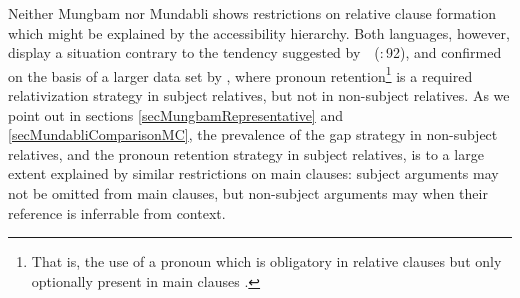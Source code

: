 \documentclass[10pt,twoside]{article}
\newcommand{\citepage}[2]{\citeauthor{#1}~{(\citeyear{#1}:\,{#2})}}
\begin{document}
Neither Mungbam nor Mundabli shows restrictions on relative clause formation which
might be explained by the accessibility hierarchy. Both languages,
however, display a situation contrary to the tendency suggested
by~\citepage{keenan:1977}{92}, and confirmed on the basis of a larger data set
by \cite{wals-2011-123,wals-2011-122}, where pronoun 
retention\footnote{That is, the use of a pronoun which is obligatory in relative clauses but only optionally present in main
clauses \citep{wals-2011-122}.}
is a required relativization strategy
in subject relatives, but not in non-subject relatives.
%
As we point out in sections \ref{secMungbamRepresentative} and \ref{secMundabliComparisonMC}, 
the prevalence of the
gap strategy in non-subject relatives, and the pronoun retention
strategy in subject relatives, is to a large extent explained
by similar restrictions on main clauses: subject arguments
may not be omitted from main clauses, but non-subject arguments
may when their reference is inferrable from context.
\end{document}
